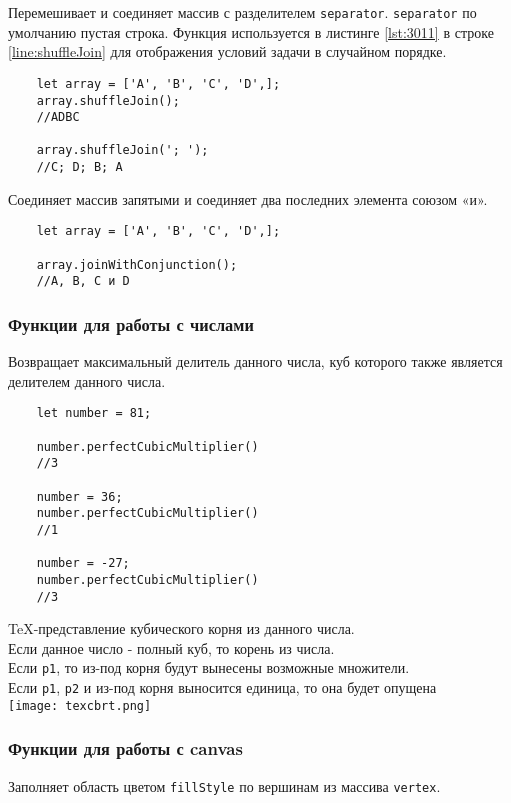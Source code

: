 Перемешивает и соединяет массив с разделителем \texttt{separator}. \texttt{separator} по умолчанию пустая строка. Функция используется в листинге \ref{lst:3011}
в строке \ref{line:shuffleJoin} для отображения условий задачи в случайном порядке.

\begin{lstlisting}
    let array = ['A', 'B', 'C', 'D',];
    array.shuffleJoin();
    //ADBC

    array.shuffleJoin('; ');
    //C; D; B; A 
\end{lstlisting}

Соединяет массив запятыми и соединяет два последних элемента союзом «и».

\begin{lstlisting}
    let array = ['A', 'B', 'C', 'D',];

    array.joinWithConjunction();
    //A, B, C и D
\end{lstlisting}

\subsubsection{Функции для работы с числами}
Возвращает максимальный делитель данного числа, куб которого также является делителем данного числа.

\begin{lstlisting}
    let number = 81;

    number.perfectCubicMultiplier()
    //3

    number = 36;
    number.perfectCubicMultiplier()
    //1

    number = -27;
    number.perfectCubicMultiplier()
    //3
\end{lstlisting}

TeX-представление кубического корня из данного числа.\\
Если данное число - полный куб, то корень из числа.\\
Если \texttt{p1}, то из-под корня будут вынесены возможные множители.\\
Если \texttt{p1}, \texttt{p2} и из-под корня выносится единица, то она будет опущена\\
\texttt{[image: texcbrt.png]}

\subsubsection{Функции для работы с canvas}
Заполняет область цветом \texttt{fillStyle} по вершинам из массива \texttt{vertex}.

